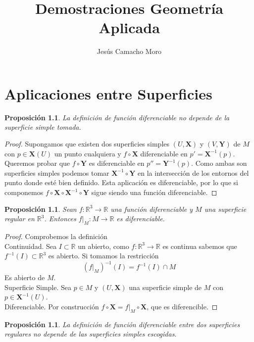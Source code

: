 \documentclass[a4paper,10pt]{book}
\title{Demostraciones Geometría Aplicada}
\author{Jesús Camacho Moro}
\newtheorem{prop}[thm]{Proposición}
\newcommand{\RR}{\mathbb R}
\newcommand{\RRR}{\RR^3}
\begin{document}
\maketitle

\chapter{Aplicaciones entre Superficies}

\begin{prop}
La definición de función diferenciable no depende de la superficie simple tomada.
\end{prop}

\begin{proof}
Supongamos que existen dos superficies simples $(U,\textbf{X})$ y $(V,\textbf{Y})$ de $M$ con $p\in \textbf{X}(U)$ un punto cualquiera y $f \circ \textbf{X}$ diferenciable en $p'=\textbf{X}^{-1}(p)$.\\
Queremos probar que $f \circ \textbf{Y}$ es diferenciable en $p''=\textbf{Y}^{-1}(p)$. Como ambas son superficies simples podemos tomar $\textbf{X}^{-1}\circ\textbf{Y}$ en la intersección de los entornos del punto donde esté bien definido. Esta aplicación es diferenciable, por lo que si componemos $f \circ \textbf{X}\circ\textbf{X}^{-1}\circ\textbf{Y}$ sigue siendo una función diferenciable.
\end{proof}

\begin{prop} Sean $f:\RRR\longrightarrow\RR$ una función diferenciable y $M$ una superficie regular en $\RRR$. Entonces $f|_M:M\longrightarrow \RR$ es diferenciable.
\end{prop}

\begin{proof}Comprobemos la definición\\
Continuidad. Sea $I\subset\RR$ un abierto, como $f:\RRR\longrightarrow\RR$ es continua sabemos que $f^{-1}(I)\subset\RRR$ es abierto. Si tomamos la restricción
\[(f|_M)^{-1}(I)=f^{-1}(I)\cap M \]
Es abierto de $M$.\\
Superficie Simple. Sea $p\in M$ y $(U,\textbf{X})$ una superficie simple de $M$ con $p\in \textbf{X}^{-1}(U)$.\\
Diferenciable. Por construcción $f\circ \textbf{X}=f|_M \circ \textbf{X}$, que es diferencible.
\end{proof} 

\begin{prop}La definición de función diferenciable entre dos superficies regulares no depende de las superficies simples escogidas.
\end{prop}
\end{document}

